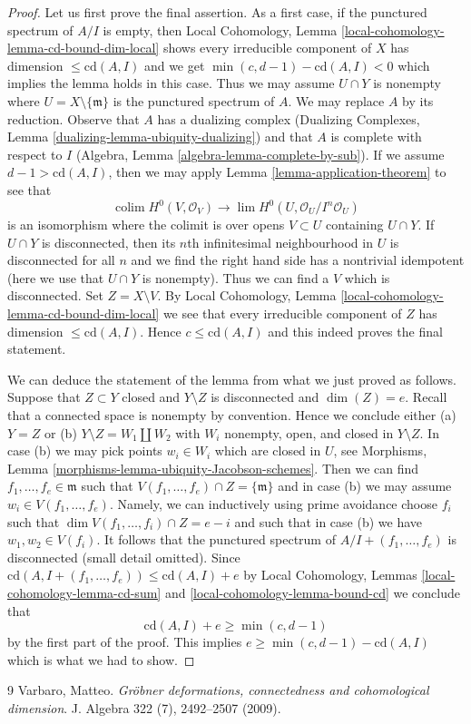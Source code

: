 \documentclass[10pt,a4paper]{amsart}
\theoremstyle{plain}
\theoremstyle{definition}
\theoremstyle{remark}
\numberwithin{equation}{subsection}
\def\lim{\mathop{\mathrm{lim}}\nolimits}
\def\colim{\mathop{\mathrm{colim}}\nolimits}
\begin{document}
\begin{proof}
Let us first prove the final assertion. As a first case, if the punctured
spectrum of $A/I$ is empty, then
Local Cohomology, Lemma \ref{local-cohomology-lemma-cd-bound-dim-local}
shows every irreducible component of $X$ has dimension
$\leq \text{cd}(A, I)$ and we get $\min(c, d - 1) - \text{cd}(A, I) < 0$
which implies the lemma holds in this case. Thus we may assume
$U \cap Y$ is nonempty where $U = X \setminus \{\mathfrak m\}$
is the punctured spectrum of $A$. We may replace $A$ by its reduction.
Observe that $A$ has a dualizing complex
(Dualizing Complexes, Lemma \ref{dualizing-lemma-ubiquity-dualizing})
and that $A$ is complete with respect to $I$
(Algebra, Lemma \ref{algebra-lemma-complete-by-sub}).
If we assume $d - 1 > \text{cd}(A, I)$, then we may apply
Lemma \ref{lemma-application-theorem} to see that
$$
\colim H^0(V, \mathcal{O}_V)
\longrightarrow
\lim H^0(U, \mathcal{O}_U/I^n\mathcal{O}_U)
$$
is an isomorphism where the colimit is over opens $V \subset U$
containing $U \cap Y$. If $U \cap Y$ is disconnected, then
its $n$th infinitesimal neighbourhood in $U$ is disconnected
for all $n$ and we find the
right hand side has a nontrivial idempotent (here we use
that $U \cap Y$ is nonempty).
Thus we can find a $V$ which is disconnected.
Set $Z = X \setminus V$. By
Local Cohomology, Lemma \ref{local-cohomology-lemma-cd-bound-dim-local}
we see that every irreducible component of $Z$ has dimension
$\leq \text{cd}(A, I)$. Hence $c \leq \text{cd}(A, I)$ and this
indeed proves the final statement.

\medskip\noindent
We can deduce the statement of the lemma from what we just proved
as follows. Suppose that $Z \subset Y$ closed and $Y \setminus Z$ is
disconnected and $\dim(Z) = e$. Recall that a connected space is nonempty
by convention. Hence we conclude either (a) $Y = Z$ or (b)
$Y \setminus Z = W_1 \amalg W_2$ with $W_i$ nonempty, open, and closed
in $Y \setminus Z$. In case (b) we may pick points $w_i \in W_i$
which are closed in $U$, see
Morphisms, Lemma \ref{morphisms-lemma-ubiquity-Jacobson-schemes}.
Then we can find $f_1, \ldots, f_e \in \mathfrak m$
such that $V(f_1, \ldots, f_e) \cap Z = \{\mathfrak m\}$
and in case (b) we may assume $w_i \in V(f_1, \ldots, f_e)$.
Namely, we can inductively using prime avoidance
choose $f_i$ such that $\dim V(f_1, \ldots, f_i) \cap Z = e - i$
and such that in case (b) we have $w_1, w_2 \in V(f_i)$.
It follows that the punctured spectrum of $A/I + (f_1, \ldots, f_e)$
is disconnected (small detail omitted). Since
$\text{cd}(A, I + (f_1, \ldots, f_e)) \leq \text{cd}(A, I) + e$ by
Local Cohomology, Lemmas \ref{local-cohomology-lemma-cd-sum} and
\ref{local-cohomology-lemma-bound-cd} we conclude that
$$
\text{cd}(A, I) + e \geq \min(c, d - 1)
$$
by the first part of the proof. This implies
$e \geq \min(c, d - 1) - \text{cd}(A, I)$ which is what we had to show.
\end{proof}

\begin{thebibliography}{9}
Varbaro, Matteo.
\newblock \emph{Gr\"obner deformations, connectedness and cohomological dimension}.
\newblock J. Algebra 322 (7), 2492--2507 (2009).
\end{thebibliography}
\end{document}

